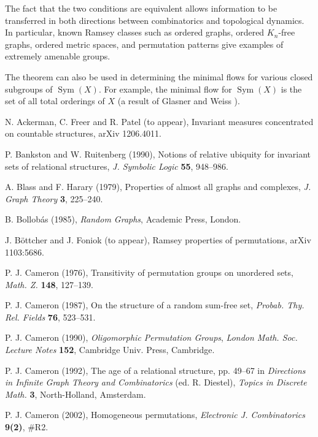 \documentclass[12pt]{article}
\DeclareMathOperator{\Sym}{Sym}
\begin{document}
The fact that the two conditions are equivalent allows information to be
transferred in both directions between combinatorics and topological dynamics.
In particular, known Ramsey classes such as ordered graphs, ordered $K_n$-free
graphs, ordered metric spaces, and permutation patterns give examples of
extremely amenable groups.

The theorem can also be used in determining the minimal flows for various
closed subgroups of $\Sym(X)$. For example, the minimal flow for $\Sym(X)$ is
the set of all total orderings of $X$ (a result of Glasner and Weiss
\cite{ch32:new8}).

\begin{thebibliography}{99}

N. Ackerman, C. Freer and R. Patel (to appear),
Invariant measures concentrated on countable structures,
arXiv 1206.4011.

P. Bankston and W. Ruitenberg (1990),
Notions of relative ubiquity for invariant sets of relational structures,
\textit{J. Symbolic Logic} \textbf{55}, 948--986.

A. Blass and F. Harary (1979),
Properties of almost all graphs and complexes,
\textit{J. Graph Theory} \textbf{3}, 225--240.

B. Bollob\'{a}s (1985),
\textit{Random Graphs}, Academic Press, London.

J. B\"ottcher and J. Foniok (to appear),
Ramsey properties of permutations,
arXiv 1103:5686.

P. J. Cameron (1976),
Transitivity of permutation groups on unordered sets,
\textit{Math. Z.} \textbf{148}, 127--139.

P. J. Cameron (1987),
On the structure of a random sum-free set,
\textit{Probab. Thy. Rel. Fields} \textbf{76}, 523--531.

P. J. Cameron (1990),
\textit{Oligomorphic Permutation Groups},
\textit{London Math. Soc. Lecture Notes} \textbf{152},
Cambridge Univ. Press, Cambridge.

 P. J. Cameron (1992), The age of a relational structure, pp. 49--67 in \textit{Directions
in Infinite Graph Theory and Combinatorics} (ed. R. Diestel),
\textit{Topics in Discrete Math.} \textbf{3}, North-Holland,
Amsterdam.

P. J. Cameron (2002),
Homogeneous permutations,
\textit{Electronic J. Combinatorics} \textbf{9(2)}, \#R2.


\end{thebibliography}
\end{document}
